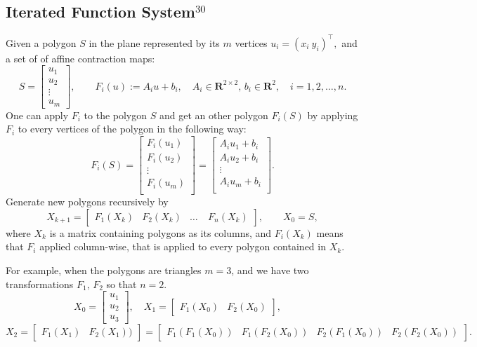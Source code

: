\documentclass[a4paper, fleqn, 10pt]{report}
\theoremstyle{definition}
\newcommand{\R}{\mathbf{R}}
\begin{document}
\subsection*{Iterated Function System$^{30}$}
Given a polygon $S$ in the plane represented by its $m$ vertices $u_{i}=(x_i\ y_i)^\top,$ and a set of of affine contraction maps:
\[S =  \begin{bmatrix}
	    u_{1}\\
	    u_{2}\\
	    \vdots\\
	    u_{m}
        \end{bmatrix},\qquad F_i(u):=A_i u + b_i, \quad A_i\in\R^{2\times 2},\,b_i\in\R^2, \quad i=1,2,\dots,n.\]
One can apply $F_i$ to the polygon $S$ and get an other polygon $F_i(S)$ by applying $F_i$
to every vertices of the polygon in the following way:
\[F_i(S) = 
	    \begin{bmatrix}
	      F_i(u_{1})\\
	      F_i(u_{2})\\
	      \vdots\\
	      F_i(u_{m})\\
	    \end{bmatrix}=
	    \begin{bmatrix}
	      A_iu_{1}+b_i\\
	      A_iu_{2}+b_i\\
	      \vdots\\
	      A_iu_{m}+b_i\\
	    \end{bmatrix}.
\]
Generate new polygons recursively by
\[X_{k+1} = \begin{bmatrix}
             F_1(X_k) & F_2(X_k) & \dots\ & F_n(X_k)
            \end{bmatrix}
, \qquad X_0 = S,\]
where $X_k$ is a matrix containing polygons as its columns, and $F_i(X_k)$ means that $F_i$
applied column-wise, that is applied to every polygon contained in $X_k.$

For example, when the polygons are triangles $m=3$, and we have two transformations $F_1,\,F_2$ so that $n=2.$ 
\[
X_0 =\begin{bmatrix}
      u_{1}\\
      u_{2}\\
      u_{3}
     \end{bmatrix},\quad
X_1 =\begin{bmatrix}
      F_1(X_0) & F_2(X_0)
     \end{bmatrix},\quad
\]
\[
X_2 =\begin{bmatrix}
      F_1(X_1) & F_2(X_1))
     \end{bmatrix}=
     \begin{bmatrix}
      F_1(F_1(X_0)) & F_1(F_2(X_0)) & F_2(F_1(X_0)) & F_2(F_2(X_0))
     \end{bmatrix}.
\]
\end{document}
